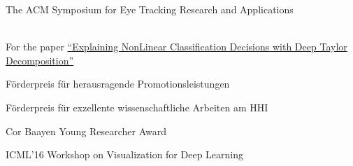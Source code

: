 {
    \ifdefined\shortcv
        {}
    \else
        {
            The ACM Symposium for Eye Tracking Research and Applications
        }
    \fi
}


{
    \ifdefined\shortcv
        {}
    \else
        {
            \\
            \hspace*{\fill} For the paper
            \href{https://doi.org/10.1016/j.patcog.2016.11.008}{``Explaining NonLinear Classification Decisions with Deep Taylor Decomposition''}
        }
    \fi
}


{
    \ifdefined\shortcv
        {}
    \else
        {
            F\"orderpreis f\"ur herausragende Promotionsleistungen
        }
    \fi
}


{
    \ifdefined\shortcv
        {}
    \else
        {
            F\"orderpreis f\"ur exzellente wissenschaftliche Arbeiten am HHI
        }
    \fi
}


{
    \ifdefined\shortcv
        {}
    \else
        {
            Cor Baayen Young Researcher Award
        }
    \fi
}


{
    \ifdefined\shortcv
        {}
    \else
        {
            ICML'16 Workshop on Visualization for Deep Learning
        }
    \fi
}


